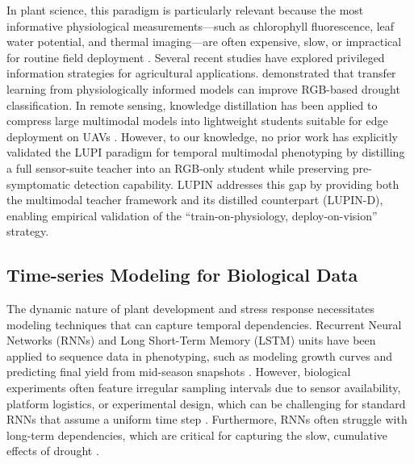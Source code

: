 \documentclass[a4paper,fleqn]{cas-dc}
\begin{document}
In plant science, this paradigm is particularly relevant because the most informative physiological measurements---such as chlorophyll fluorescence, leaf water potential, and thermal imaging---are often expensive, slow, or impractical for routine field deployment \citep{furbankPhenomicsTechnologiesRelieve2011}. Several recent studies have explored privileged information strategies for agricultural applications. \citet{patraExplainableVisionTransformer2025} demonstrated that transfer learning from physiologically informed models can improve RGB-based drought classification. In remote sensing, knowledge distillation has been applied to compress large multimodal models into lightweight students suitable for edge deployment on UAVs \citep{zouAdaptingVisionFoundation2024}. However, to our knowledge, no prior work has explicitly validated the LUPI paradigm for temporal multimodal phenotyping by distilling a full sensor-suite teacher into an RGB-only student while preserving pre-symptomatic detection capability. LUPIN addresses this gap by providing both the multimodal teacher framework and its distilled counterpart (LUPIN-D), enabling empirical validation of the ``train-on-physiology, deploy-on-vision'' strategy.

\subsection{Time-series Modeling for Biological Data}\label{sec:related:temporal}

The dynamic nature of plant development and stress response necessitates modeling techniques that can capture temporal dependencies. Recurrent Neural Networks (RNNs) and Long Short-Term Memory (LSTM) units have been applied to sequence data in phenotyping, such as modeling growth curves and predicting final yield from mid-season snapshots \citep{joshiDeepTransferLearningStrategiesCrop2024}. However, biological experiments often feature irregular sampling intervals due to sensor availability, platform logistics, or experimental design, which can be challenging for standard RNNs that assume a uniform time step \citep{fioraniFutureScenariosPlant2013}. Furthermore, RNNs often struggle with long-term dependencies, which are critical for capturing the slow, cumulative effects of drought \citep{bengioLearningLongtermDependencies1994}.
\end{document}
